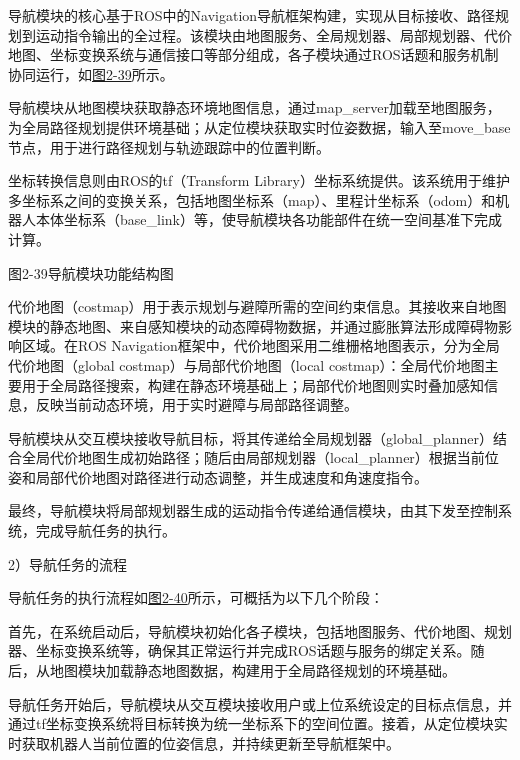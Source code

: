 导航模块的核心基于ROS中的Navigation导航框架构建，实现从目标接收、路径规划到运动指令输出的全过程。该模块由地图服务、全局规划器、局部规划器、代价地图、坐标变换系统与通信接口等部分组成，各子模块通过ROS话题和服务机制协同运行，如\hyperref[_Ref201344435]{图2-39}所示。

导航模块从地图模块获取静态环境地图信息，通过map\_server加载至地图服务，为全局路径规划提供环境基础；从定位模块获取实时位姿数据，输入至move\_base节点，用于进行路径规划与轨迹跟踪中的位置判断。

坐标转换信息则由ROS的tf（Transform
Library）坐标系统提供。该系统用于维护多坐标系之间的变换关系，包括地图坐标系（map）、里程计坐标系（odom）和机器人本体坐标系（base\_link）等，使导航模块各功能部件在统一空间基准下完成计算。



\protect{}\label{_Ref201344435}{}图2-39导航模块功能结构图

代价地图（costmap）用于表示规划与避障所需的空间约束信息。其接收来自地图模块的静态地图、来自感知模块的动态障碍物数据，并通过膨胀算法形成障碍物影响区域。在ROS
Navigation框架中，代价地图采用二维栅格地图表示，分为全局代价地图（global
costmap）与局部代价地图（local
costmap）：全局代价地图主要用于全局路径搜索，构建在静态环境基础上；局部代价地图则实时叠加感知信息，反映当前动态环境，用于实时避障与局部路径调整。

导航模块从交互模块接收导航目标，将其传递给全局规划器（global\_planner）结合全局代价地图生成初始路径；随后由局部规划器（local\_planner）根据当前位姿和局部代价地图对路径进行动态调整，并生成速度和角速度指令。

最终，导航模块将局部规划器生成的运动指令传递给通信模块，由其下发至控制系统，完成导航任务的执行。

2）导航任务的流程

导航任务的执行流程如\hyperref[_Ref201344461]{图2-40}所示，可概括为以下几个阶段：

首先，在系统启动后，导航模块初始化各子模块，包括地图服务、代价地图、规划器、坐标变换系统等，确保其正常运行并完成ROS话题与服务的绑定关系。随后，从地图模块加载静态地图数据，构建用于全局路径规划的环境基础。

导航任务开始后，导航模块从交互模块接收用户或上位系统设定的目标点信息，并通过tf坐标变换系统将目标转换为统一坐标系下的空间位置。接着，从定位模块实时获取机器人当前位置的位姿信息，并持续更新至导航框架中。



